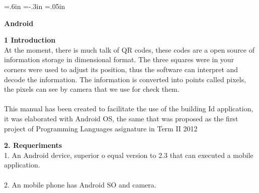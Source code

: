 {\leftskip=.6in  \parindent=-.3in  \parskip=.05in

\bigskip

\centerline {\namefont \LARGE \bf Android}
\bigskip
\bigskip
\bigskip

{\bf 1 Introduction}
\bigskip
\\At the moment, there is much talk of QR codes, these codes are a open source of information storage in dimensional format. The three squares were in your corners were used to adjust its position, thus the software can interpret and decode the information. The information is converted into points called pixels, the pixels can see by camera that we use for check them.\\
\\This manual has been created to facilitate the use of the building Id application, it was elaborated with Android OS, the same that was proposed as the first project of Programming Languages asignature in Term II 2012
\bigskip
\bigskip

{\bf 2. Requeriments}
\bigskip
\\1. 	An Android device, superior o equal version to 2.3 that can executed a mobile application.\\
\\2.	An mobile phone has Android SO and camera.

\bigskip
\bigskip

}
